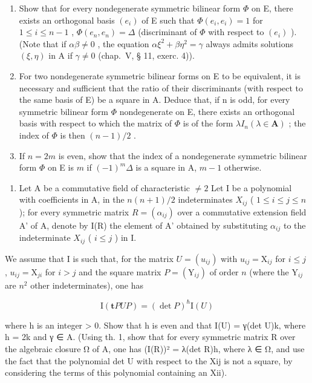 \begin{enumerate}
\def\labelenumi{\alph{enumi})}
\item
  Show that for every nondegenerate symmetric bilinear form \(\Phi\) on E, there exists an orthogonal basis \((e_i)\) of E such that \(\Phi(e_i, e_i) = 1\) for \(1 \leqslant i \leqslant n - 1\) , \(\Phi(e_n, e_n) = \Delta\) (discriminant of \(\Phi\) with respect to \((e_i)\) ). (Note that if \(\alpha\beta \neq 0\) , the equation \(\alpha\xi^2 + \beta\eta^2 = \gamma\) always admits solutions \((\xi, \eta)\) in A if \(\gamma \neq 0\) (chap.~V, § 11, exerc. 4)).
\item
  For two nondegenerate symmetric bilinear forms on E to be equivalent, it is necessary and sufficient that the ratio of their discriminants (with respect to the same basis of E) be a square in A. Deduce that, if n is odd, for every symmetric bilinear form \(\Phi\) nondegenerate on E, there exists an orthogonal basis with respect to which the matrix of \(\Phi\) is of the form \(\lambda I_{n} (\lambda \in \mathbf{A})\) ; the index of \(\Phi\) is then \((n - 1)/2\) .
\item
  If \(n=2m\) is even, show that the index of a nondegenerate symmetric bilinear form \(\Phi\) on E is \(m\) if \((-1)^{m}\Delta\) is a square in A, \(m-1\) otherwise.
\end{enumerate}

\begin{enumerate}
\def\labelenumi{\arabic{enumi})}
\setcounter{enumi}{4}
\tightlist
\item
  Let A be a commutative field of characteristic \(\neq 2\) Let I be a polynomial with coefficients in A, in the \(n(n+1)/2\) indeterminates \(X_{ij}\) ( \(1 \leqslant i \leqslant j \leqslant n\) ); for every symmetric matrix \(R = (\alpha_{ij})\) over a commutative extension field A' of A, denote by I(R) the element of A' obtained by substituting \(\alpha_{ij}\) to the indeterminate \(X_{ij}\) ( \(i \leqslant j\) ) in I.
\end{enumerate}

We assume that I is such that, for the matrix \(U = (u_{ij})\) with \(u_{ij} = \mathrm{X}_{ij}\) for \(i \leqslant j\) , \(u_{ij} = \mathrm{X}_{ji}\) for \(i > j\) and the square matrix \(P = (\mathrm{Y}_{ij})\) of order \(n\) (where the \(\mathrm{Y}_{ij}\) are \(n^2\) other indeterminates), one has

\[
\mathrm{I} (\mathbf {t} P U P) = (\det P) ^ {\hbar} \mathrm{I} (U)
\]

where h is an integer \textgreater{} 0. Show that h is even and that I(U) = γ(det U)k, where h = 2k and γ ∈ A. (Using th. 1, show that for every symmetric matrix R over the algebraic closure Ω of A, one has (I(R))² = λ(det R)h, where λ ∈ Ω, and use the fact that the polynomial det U with respect to the Xij is not a square, by considering the terms of this polynomial containing an Xii).

